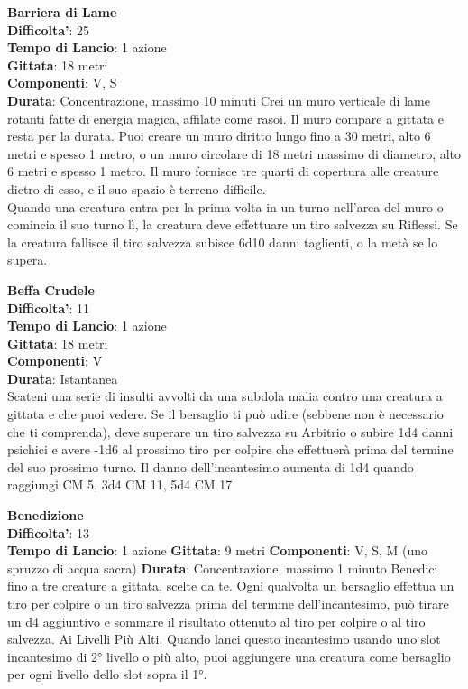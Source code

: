 \begin{multicols}{2}
\medskip\textbf{Barriera di Lame}\\
\textbf{Difficolta'}: 25\\
\textbf{Tempo di Lancio}: 1 azione\\
\textbf{Gittata}: 18 metri\\
\textbf{Componenti}: V, S\\
\textbf{Durata}: Concentrazione, massimo 10 minuti Crei un muro verticale di lame rotanti fatte di energia magica, affilate come rasoi. Il muro compare a gittata e resta per la durata. Puoi creare un muro diritto lungo fino a 30 metri, alto 6 metri e spesso 1 metro, o un muro circolare di 18 metri massimo di diametro, alto 6 metri e spesso 1 metro. Il muro fornisce tre quarti di copertura alle creature dietro di esso, e il suo spazio è terreno difficile. \\
Quando una creatura entra per la prima volta in un turno nell’area del muro o comincia il suo turno lì, la creatura deve effettuare un tiro salvezza su Riflessi. Se la creatura fallisce il tiro salvezza subisce 6d10 danni taglienti, o la metà se lo supera.


\medskip\textbf{Beffa Crudele}\\
\textbf{Difficolta'}: 11\\
\textbf{Tempo di Lancio}: 1 azione\\
\textbf{Gittata}: 18 metri\\
\textbf{Componenti}: V\\
\textbf{Durata}: Istantanea\\
Scateni una serie di insulti avvolti da una subdola malia contro una creatura a gittata e che puoi vedere. Se il bersaglio ti può udire (sebbene non è necessario che ti comprenda), deve superare un tiro salvezza su Arbitrio o subire 1d4 danni psichici e avere -1d6 al prossimo tiro per colpire che effettuerà prima del termine del suo prossimo turno. Il danno dell’incantesimo aumenta di 1d4 quando raggiungi CM 5, 3d4 CM 11, 5d4 CM 17

\medskip\textbf{Benedizione}\\
\textbf{Difficolta'}: 13\\
\textbf{Tempo di Lancio}: 1 azione
\textbf{Gittata}: 9 metri
\textbf{Componenti}: V, S, M (uno spruzzo di acqua sacra)
\textbf{Durata}: Concentrazione, massimo 1 minuto
Benedici fino a tre creature a gittata, scelte da te. Ogni
qualvolta un bersaglio effettua un tiro per colpire o un
tiro salvezza prima del termine dell’incantesimo, può
tirare un d4 aggiuntivo e sommare il risultato ottenuto al
tiro per colpire o al tiro salvezza.
Ai Livelli Più Alti. Quando lanci questo incantesimo
usando uno slot incantesimo di 2° livello o più alto, puoi
aggiungere una creatura come bersaglio per ogni livello
dello slot sopra il 1°.



\end{multicols}
